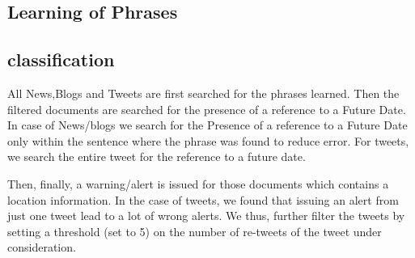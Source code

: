 \subsection{Learning of Phrases}



\subsection{classification}

All News,Blogs and Tweets are first searched for the phrases learned. Then the filtered documents are searched for the presence of a reference to a Future Date. In case of News/blogs we search for the Presence of a reference to a Future Date only within the sentence where the phrase was found to reduce error. For tweets, we search the entire tweet for the reference to a future date.

Then, finally, a warning/alert is issued for those documents which contains a location information. In the case of tweets, we found that issuing an alert from just one tweet lead to a lot of wrong alerts. We thus, further filter the tweets by setting a threshold (set to 5) on the number of re-tweets of the tweet under consideration.
